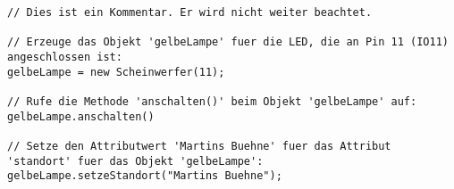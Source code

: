 \documentclass[11pt, a4paper]{article}
\begin{document}
\lstset{language=Java}
\javastyle 
\begin{lstlisting}[caption={Steuerung eines Scheinwerfers.},label={listing:einfache_led}]
// Dies ist ein Kommentar. Er wird nicht weiter beachtet.

// Erzeuge das Objekt 'gelbeLampe' fuer die LED, die an Pin 11 (IO11) angeschlossen ist:
gelbeLampe = new Scheinwerfer(11);

// Rufe die Methode 'anschalten()' beim Objekt 'gelbeLampe' auf: 
gelbeLampe.anschalten()

// Setze den Attributwert 'Martins Buehne' fuer das Attribut 'standort' fuer das Objekt 'gelbeLampe':
gelbeLampe.setzeStandort("Martins Buehne");
\end{lstlisting}

\vfill

\begin{table}[htb]
\centering
{}
\end{table}
\end{document}
